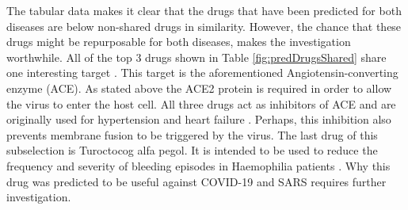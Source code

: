 The tabular data makes it clear that the drugs that have been predicted for both diseases are below non-shared drugs in similarity. However, the chance that these drugs might be repurposable for both diseases, makes the investigation worthwhile. 
All of the top 3 drugs shown in Table \ref{fig:predDrugsShared} share one interesting target \cite{Wishart2017}. This target is the aforementioned Angiotensin-converting enzyme (ACE). As stated above the ACE2 protein is required in order to allow the virus to enter the host cell. All three drugs act as inhibitors of ACE and are originally used for hypertension and heart failure \cite{Wishart2017}. Perhaps, this inhibition also prevents membrane fusion to be triggered by the virus.
The last drug of this subselection is Turoctocog alfa pegol. It is intended to be used to reduce the frequency and severity of bleeding episodes in Haemophilia patients \cite{Wishart2017}. Why this drug was predicted to be useful against COVID-19 and SARS requires further investigation.


